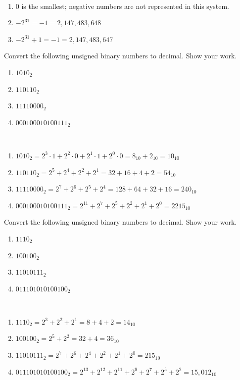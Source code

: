\documentclass[12pt]{article}
\newenvironment{ex}[2][Exercise]{\begin{trivlist}
		\item[\hskip \labelsep {\bfseries #1}\hskip \labelsep {\bfseries #2.}]}{\end{trivlist}}
\newenvironment{sol}[1][Solution]{\begin{trivlist}
		\item[\hskip \labelsep {\bfseries #1:}]}{\end{trivlist}}
\begin{document}
\begin{sol}\
	\begin{enumerate}[label=(\alph*)]
		\item 0 is the smallest; negative numbers are not represented in this system.
		\item $-2^{31}=-1=2,147,483,648$
		\item $-2^{31}+1=-1=2,147,483,647$
	\end{enumerate}
\end{sol}

\begin{ex}{1.13}
	Convert the following unsigned binary numbers to decimal. Show your work.
	\begin{enumerate}[label=(\alph*)]
		\item $1010_2$
		\item $110110_2$
		\item $11110000_2$
		\item $000100010100111_2$
	\end{enumerate}
\end{ex}

\begin{sol}\
	\begin{enumerate}[label=(\alph*)]
		\item $1010_2=2^{3}\cdot 1+2^{2}\cdot 0+2^{1}\cdot 1+2^{0}\cdot 0=8_{10}+2_{10}=10_{10}$
		\item $110110_2=2^{5}+2^{4}+2^{2}+2^{1}=32+16+4+2=54_{10}$
		\item $11110000_2=2^{7}+2^{6}+2^{5}+2^{4}=128+64+32+16=240_{10}$
		\item $000100010100111_2=2^{11}+2^7+2^5+2^2+2^1+2^0=2215_{10}$
	\end{enumerate}
\end{sol}

\begin{ex}{1.14}
	Convert the following unsigned binary numbers to decimal. Show your work.
	\begin{enumerate}[label=(\alph*)]
		\item $1110_2$
		\item $100100_2$
		\item $11010111_2$
		\item $011101010100100_2$
	\end{enumerate}
\end{ex}

\begin{sol}\
	\begin{enumerate}[label=(\alph*)]
		\item $1110_2=2^3+2^2+2^1=8+4+2=14_{10}$
		\item $100100_2=2^5+2^2=32+4=36_{10}$
		\item $11010111_2=2^7+2^6+2^4+2^2+2^1+2^0=215_{10}$
		\item $011101010100100_2=2^{13}+2^{12}+2^{11}+2^9+2^7+2^5+2^2=15,012_{10}$
	\end{enumerate}
\end{sol}
\end{document}
